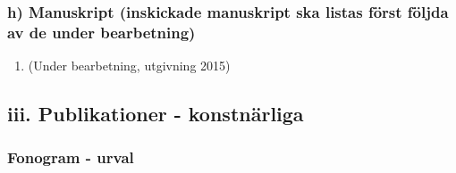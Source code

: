 \subsubsection*{\textsf{h) Manuskript (inskickade manuskript ska listas först följda av de under bearbetning)}}

\begin{enumerate}
\item {} (Under bearbetning, utgivning 2015)
\end{enumerate}

\newpage
\subsection*{\textsf{iii. Publikationer - konstnärliga}}

\subsubsection*{\textsf{Fonogram - urval}}

